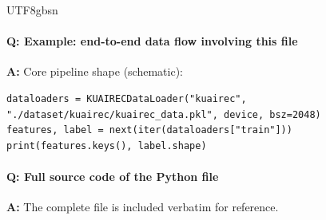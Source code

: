 \documentclass[11pt]{article}
\begin{document}
\begin{CJK*}{UTF8}{gbsn}
\paragraph{Q: Example: end-to-end data flow involving this file}
\textbf{A:} Core pipeline shape (schematic):

\begin{Verbatim}[fontsize=\small]
dataloaders = KUAIRECDataLoader("kuairec", "./dataset/kuairec/kuairec_data.pkl", device, bsz=2048)
features, label = next(iter(dataloaders["train"]))
print(features.keys(), label.shape)
\end{Verbatim}

\paragraph{Q: Full source code of the Python file}
\textbf{A:} The complete file is included verbatim for reference.


\end{CJK*}
\end{document}
